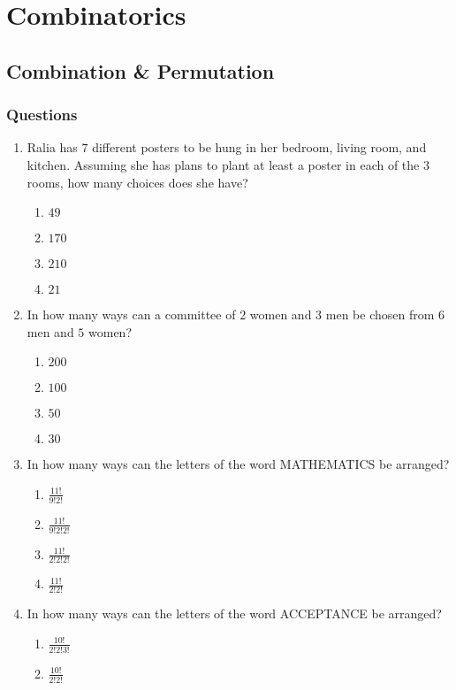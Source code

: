 \chapter{Combinatorics}
\section{Combination \& Permutation}
\subsection{Questions}
\begin{multicols}{2}
\begin{enumerate}[label={\arabic*.}]
\item Ralia has \(7\) different posters to be hung in her bedroom, living room, and kitchen. Assuming she has plans to plant at least a poster in each of the \(3\) rooms, how many choices does she have?
	\begin{enumerate}[label={\Alph*.}]
	\item \(49\)
	\item \(170\)
	\item \(210\)
	\item \(21\)
	\end{enumerate}
\item In how many ways can a committee of \(2\) women and \(3\) men be chosen from \(6\) men and \(5\) women?
	\begin{enumerate}[label={\Alph*.}]
	\item \(200\)
	\item \(100\)
	\item \(50\)
	\item \(30\)
	\end{enumerate}
\item In how many ways can the letters of the word MATHEMATICS be arranged?
	\begin{enumerate}[label={\Alph*.}]
	\item \(\frac{11!}{9!2!}\)
	\item \(\frac{11!}{9!2!2!}\)
	\item \(\frac{11!}{2!2!2!}\)
	\item \(\frac{11!}{2!2!}\)
	\end{enumerate}
\item In how many ways can the letters of the word ACCEPTANCE be arranged?
	\begin{enumerate}[label={\Alph*.}]
	\item \(\frac{10!}{2!2!3!}\)
	\item \(\frac{10!}{2!2!}\)

\end{enumerate}
\end{enumerate}
\end{multicols}
